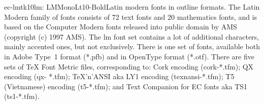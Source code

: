 \documentclass{ddltxtyp}
\begin{document}
\begin{package}{ec-lmtk10}{lm: LMMonoLt10-Bold}{Latin modern fonts in outline formats.}
The Latin Modern family of fonts consists of 72 text fonts and
20 mathematics fonts, and is based on the Computer Modern fonts
released into public domain by AMS (copyright (c) 1997 AMS).
The lm font set contains a lot of additional characters, mainly
accented ones, but not exclusively. There is one set of fonts,
available both in Adobe Type~1 format (*.pfb) and in OpenType
format (*.otf). There are five sets of {\TeX} Font Metric files,
corresponding to: Cork encoding (cork-*.tfm); QX encoding (qx-
*.tfm); {\TeX}'n'ANSI aka LY1 encoding (texnansi-*.tfm); T5
(Vietnamese) encoding (t5-*.tfm); and Text Companion for EC
fonts aka TS1 (ts1-*.tfm).
\end{package}
\end{document}
